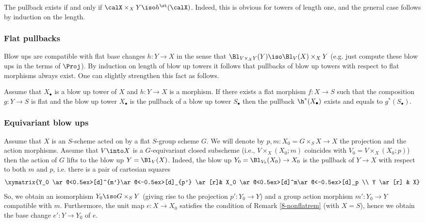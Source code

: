 \documentclass[10pt]{../fichiers-configuration-latex/smfart}
\begin{document}
\begin{remark2}\label{8-pullrem} The pullback exists if and only if
$\calX\times_XY\iso h^\st(\calX)$. Indeed, this is obvious for
towers of length one, and the general case follows by induction on
the length.  \end{remark2}

\subsubsection{Flat pullbacks}\label{8-flatpullsec} Blow ups are
compatible with flat base changes $h\colon Y\to X$ in the sense that
$\Bl_{V\times_XY}(Y)\iso\Bl_V(X)\times_XY$ (e.g. just compute
these blow ups in the terms of $\Proj$). By induction on length
of blow up towers it follows that pullbacks of blow up towers with
respect to flat morphisms always exist. One can slightly strengthen
this fact as follows.

\begin{remark2}\label{8-nonflatrem} Assume that $X_\bullet$ is a
blow up tower of $X$ and $h{\colon}Y\to X$ is a morphism. If there
exists a flat morphism $f{\colon}X\to S$ such that the composition
$g{\colon}Y\to S$ is flat and the blow up tower $X_\bullet$ is
the pullback of a blow up tower $S_\bullet$ then the pullback
$\h^*(X_\bullet)$ exists and equals to $g^*(S_\bullet)$.  \end{remark2}

\subsubsection{Equivariant blow ups}\label{8-equivsec} Assume
that $X$ is an $S$-scheme acted on by a flat $S$-group scheme
$G$. We will denote by $p,m\colon X_0=G\times_SX\to X$ the
projection and the action morphisms. Assume that $V\into X$ is
a $G$-equivariant closed subscheme (i.e., $V\times_{X}(X_0;m)$
coincides with $V_0=V\times_{X}(X_0;p)$) then the action
of $G$ lifts to the blow up $Y=\Bl_V(X)$. Indeed, the blow up
$Y_0=\Bl_{V_0}(X_0)\to X_0$ is the pullback of $Y\to X$ with respect
to both $m$ and $p$, i.e. there is a pair of cartesian squares $$
\xymatrix{Y_0 \ar@<0.5ex>[d]^{m'}\ar@<-0.5ex>[d]_{p'} \ar[r]& X_0
\ar@<0.5ex>[d]^m\ar@<-0.5ex>[d]_p \\ Y \ar[r] & X} $$ So, we obtain
an isomorphism $Y_0\iso G\times_SY$ (giving rise to the projection
$p'\colon Y_0\to Y$) and a group action morphism $m'\colon Y_0\to Y$
compatible with $m$. Furthermore, the unit map $e{\colon}X\to X_0$
satisfies the condition of Remark \ref{8-nonflatrem} (with $X=S$),
hence we obtain the base change $e'{\colon}Y\to Y_0$ of $e$.
\end{document}
